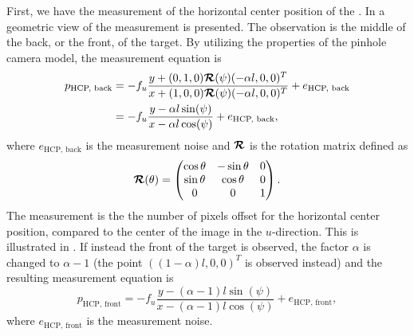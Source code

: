 First, we have the measurement of the horizontal center position of the \abbrROI.
In  a geometric view of the measurement is presented.
The observation is the middle of the back, or the front, of the target.
By utilizing the properties of the pinhole camera model, the measurement equation is
%
\begin{equation}
\begin{split}
    p_{\text{HCP, back}} &= -f_u \frac{y + (0,1,0) \bm{\mathcal{R}}(\psi) (- \alpha l,0,0)^T}{x + (1,0,0) \bm{\mathcal{R}}(\psi) (- \alpha l,0,0)^T} + e_{\text{HCP, back}}\\
    &= -f_u \frac{y - \alpha l \sin(\psi)}{x - \alpha l \cos(\psi)} + e_{\text{HCP, back}},
\end{split}
\end{equation}
%
where $e_{\text{HCP, back}}$ is the measurement noise and $\bm{\mathcal{R}}$ is the  rotation matrix defined as
\begin{equation*}
	\bm{\mathcal{R}}(\theta) =
	\begin{pmatrix}
		\cos\theta & -\sin\theta & 0 \\
		\sin\theta & \cos\theta & 0 \\
		0 & 0 & 1
	\end{pmatrix}.
\end{equation*}
The measurement is the the number of pixels offset for the horizontal center position, compared to the center of the image in the $u$-direction.
This is illustrated in .
If instead the front of the target is observed, the factor $\alpha$ is changed to $\alpha-1$ (the point $((1-\alpha)l,0,0)^T$ is observed instead) and the resulting measurement equation is
%
\begin{equation}
    p_{\text{HCP, front}} = -f_u \frac{y - (\alpha - 1) l \sin(\psi)}{x - (\alpha - 1) l \cos(\psi)} + e_{\text{HCP, front}},
\end{equation}
%
where $e_{\text{HCP, front}}$ is the measurement noise.

